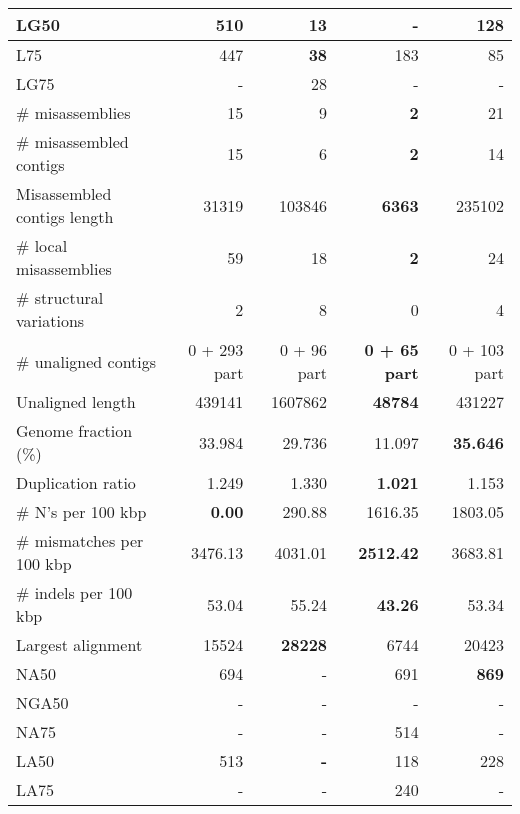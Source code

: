 \documentclass[12pt,a4paper]{article}
\begin{document}
\begin{table}[ht]
\begin{center}
\begin{tabular}{|l*{4}{|r}|}
LG50 & 510 & 13 & {\bf -} & 128 \\ \hline
L75 & 447 & {\bf 38} & 183 & 85 \\ \hline
LG75 & - & 28 & - & - \\ \hline
\# misassemblies & 15 & 9 & {\bf 2} & 21 \\ \hline
\# misassembled contigs & 15 & 6 & {\bf 2} & 14 \\ \hline
Misassembled contigs length & 31319 & 103846 & {\bf 6363} & 235102 \\ \hline
\# local misassemblies & 59 & 18 & {\bf 2} & 24 \\ \hline
\# structural variations & 2 & 8 & 0 & 4 \\ \hline
\# unaligned contigs & 0 + 293 part & 0 + 96 part & {\bf 0 + 65 part} & 0 + 103 part \\ \hline
Unaligned length & 439141 & 1607862 & {\bf 48784} & 431227 \\ \hline
Genome fraction (\%) & 33.984 & 29.736 & 11.097 & {\bf 35.646} \\ \hline
Duplication ratio & 1.249 & 1.330 & {\bf 1.021} & 1.153 \\ \hline
\# N's per 100 kbp & {\bf 0.00} & 290.88 & 1616.35 & 1803.05 \\ \hline
\# mismatches per 100 kbp & 3476.13 & 4031.01 & {\bf 2512.42} & 3683.81 \\ \hline
\# indels per 100 kbp & 53.04 & 55.24 & {\bf 43.26} & 53.34 \\ \hline
Largest alignment & 15524 & {\bf 28228} & 6744 & 20423 \\ \hline
NA50 & 694 & - & 691 & {\bf 869} \\ \hline
NGA50 & - & - & - & - \\ \hline
NA75 & - & - & 514 & - \\ \hline
LA50 & 513 & {\bf -} & 118 & 228 \\ \hline
LA75 & - & - & 240 & - \\ \hline
\end{tabular}
\end{center}
\end{table}
\end{document}
